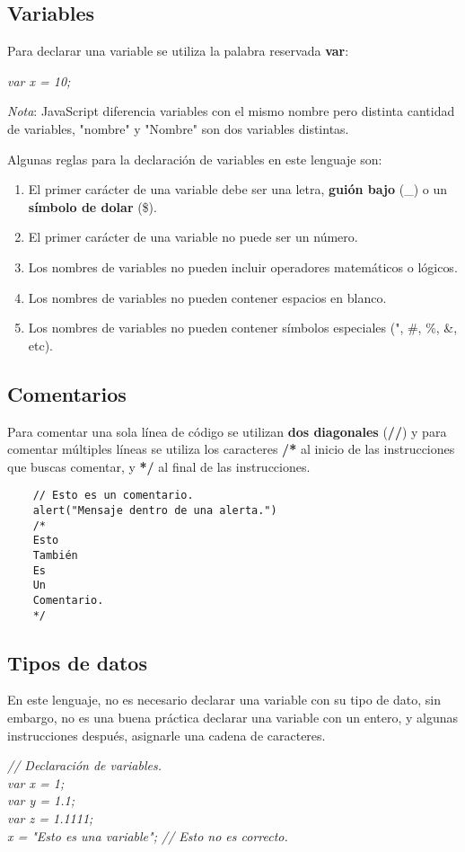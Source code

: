 \subsection{Variables}
\hspace{0.55cm}Para declarar una variable se utiliza la palabra reservada \textbf{var}:
\begin{center}
    \textit{var x = 10;}
\end{center}

\textit{Nota}: JavaScript diferencia variables con el mismo nombre pero distinta cantidad de variables, "nombre" y "Nombre" son dos variables distintas.

Algunas reglas para la declaración de variables en este lenguaje son:
\begin{enumerate}
    \item El primer carácter de una variable debe ser una letra, \textbf{guión bajo} (\_) o un \textbf{símbolo de dolar} (\$).
    \item El primer carácter de una variable no puede ser un número.
    \item Los nombres de variables no pueden incluir operadores matemáticos o lógicos.
    \item Los nombres de variables no pueden contener espacios en blanco.
    \item Los nombres de variables no pueden contener símbolos especiales (", \#, \%, \&, etc).
\end{enumerate}


\subsection{Comentarios}
\hspace{0.55cm}Para comentar una sola línea de código se utilizan \textbf{dos diagonales} (\textbf{//}) y para comentar múltiples líneas se utiliza los caracteres \textbf{/*} al inicio de las instrucciones que buscas comentar, y \textbf{*/} al final de las instrucciones.
\begin{lstlisting}
    // Esto es un comentario.
    alert("Mensaje dentro de una alerta.")
    /*
    Esto
    También
    Es
    Un
    Comentario.
    */
\end{lstlisting}


\subsection{Tipos de datos}
\hspace{0.55cm}En este lenguaje, no es necesario declarar una variable con su tipo de dato, sin embargo, no es una buena práctica declarar una variable con un entero, y algunas instrucciones después, asignarle una cadena de caracteres.
\begin{center}
    \textit{
            // Declaración de variables. \\
            var x = 1; \\
            var y = 1.1; \\
            var z = 1.1111; \\
            x = "Esto es una variable"; // Esto no es correcto.
            }
\end{center}

